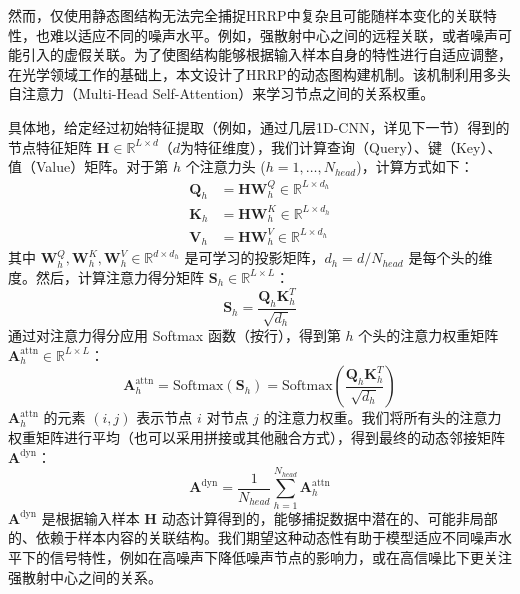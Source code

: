 然而，仅使用静态图结构无法完全捕捉HRRP中复杂且可能随样本变化的关联特性，也难以适应不同的噪声水平。例如，强散射中心之间的远程关联，或者噪声可能引入的虚假关联。为了使图结构能够根据输入样本自身的特性进行自适应调整，在光学领域工作的基础上，本文设计了HRRP的动态图构建机制。该机制利用多头自注意力（Multi-Head Self-Attention）来学习节点之间的关系权重。

具体地，给定经过初始特征提取（例如，通过几层1D-CNN，详见下一节）得到的节点特征矩阵 $\mathbf{H} \in \mathbb{R}^{L \times d}$（$d$为特征维度），我们计算查询（Query）、键（Key）、值（Value）矩阵。对于第 $h$ 个注意力头 ($h=1, \dots, N_{head}$)，计算方式如下：
\begin{align}
    \mathbf{Q}_h &= \mathbf{H} \mathbf{W}_h^Q \in \mathbb{R}^{L \times d_h} \\
    \mathbf{K}_h &= \mathbf{H} \mathbf{W}_h^K \in \mathbb{R}^{L \times d_h} \\
    \mathbf{V}_h &= \mathbf{H} \mathbf{W}_h^V \in \mathbb{R}^{L \times d_h}
\end{align}
其中 $\mathbf{W}_h^Q, \mathbf{W}_h^K, \mathbf{W}_h^V \in \mathbb{R}^{d \times d_h}$ 是可学习的投影矩阵，$d_h = d / N_{head}$ 是每个头的维度。然后，计算注意力得分矩阵 $\mathbf{S}_h \in \mathbb{R}^{L \times L}$：
\begin{equation}
    \mathbf{S}_h = \frac{\mathbf{Q}_h \mathbf{K}_h^T}{\sqrt{d_h}}
    \label{eq:attention_scores}
\end{equation}
通过对注意力得分应用 Softmax 函数（按行），得到第 $h$ 个头的注意力权重矩阵 $\mathbf{A}_h^{\text{attn}} \in \mathbb{R}^{L \times L}$：
\begin{equation}
    \mathbf{A}_h^{\text{attn}} = \text{Softmax}(\mathbf{S}_h) = \text{Softmax}\left(\frac{\mathbf{Q}_h \mathbf{K}_h^T}{\sqrt{d_h}}\right)
    \label{eq:dynamic_adjacency_head}
\end{equation}
$\mathbf{A}_h^{\text{attn}}$ 的元素 $(i,j)$ 表示节点 $i$ 对节点 $j$ 的注意力权重。我们将所有头的注意力权重矩阵进行平均（也可以采用拼接或其他融合方式），得到最终的动态邻接矩阵 $\mathbf{A}^{\text{dyn}}$：
\begin{equation}
    \mathbf{A}^{\text{dyn}} = \frac{1}{N_{head}} \sum_{h=1}^{N_{head}} \mathbf{A}_h^{\text{attn}}
    \label{eq:dynamic_adjacency_final}
\end{equation}
$\mathbf{A}^{\text{dyn}}$ 是根据输入样本 $\mathbf{H}$ 动态计算得到的，能够捕捉数据中潜在的、可能非局部的、依赖于样本内容的关联结构。我们期望这种动态性有助于模型适应不同噪声水平下的信号特性，例如在高噪声下降低噪声节点的影响力，或在高信噪比下更关注强散射中心之间的关系。

